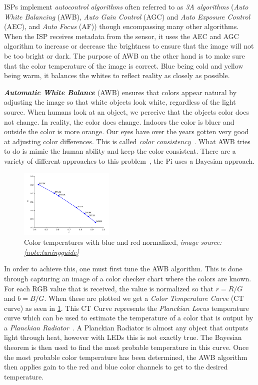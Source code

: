 ISPs implement \textit{autocontrol algorithms} often referred to as \textit{3A algorithms} (\textit{Auto
White Balancing} (AWB), \textit{Auto Gain Control} (AGC) and \textit{Auto
Exposure Control} (AEC), and \textit{Auto Focus} (AF)) though encompassing many
other algorithms. When the ISP receives metadata from the sensor, it uses the
AEC and AGC algorithm to increase or decrease the brightness to ensure that the
image will not be too bright or dark. The purpose of AWB on the other hand is
to make sure that the color temperature of the image is correct. Blue being cold and
yellow being warm, it balances the whites to reflect reality as closely as
possible.

\textit{\textbf{Automatic White Balance}} (AWB) ensures that colors appear
natural by adjusting the image so that white objects look white, regardless of
the light source. When humans look at an object, we perceive that the objects color
does not change. In reality, the color does change. Indoors the color
is bluer and outside the color is more orange. Our eyes have over the years
gotten very good at adjusting color differences. This is called \textit{color
consistency}~\cite{foster2011color, ebner2021color}. What AWB tries to do is
mimic the human ability and keep the color consistent. There are a variety of
different approaches to this problem~\cite{agarwal2006overview}, the Pi uses a
Bayesian approach.

\begin{figure}
    \begin{center}
        \includegraphics[width=0.4\textwidth]{figures/temperature.png}
    \end{center}
    \caption{Color temperatures with blue and red normalized, \textit{image source: \cref{note:tuningguide}}}\label{fig:temperatures}
\end{figure}
In order to achieve this, one must first tune the AWB algorithm. This is done
through capturing an image of a color checker chart where the colors are known.
For each RGB value that is received, the value is normalized so that $r = R /
G$ and $b = B / G$. When these are plotted we get a \textit{Color Temperature
Curve} (CT curve) as seen in \cref{fig:temperatures}. This CT Curve
represents the \textit{Planckian Locus}
temperature curve which can be used to estimate the temperature of a color that
is output by a \textit{Planckian Radiator}~\cite{international1957international}.
A Planckian Radiator is almost any object that outputs light through heat,
however with LEDs this is not exactly true. The Bayesian theorem is then used
to find the most probable temperature in this curve. Once the most probable
color temperature has been determined, the AWB algorithm then applies gain to
the red and blue color channels to get to the desired temperature.


